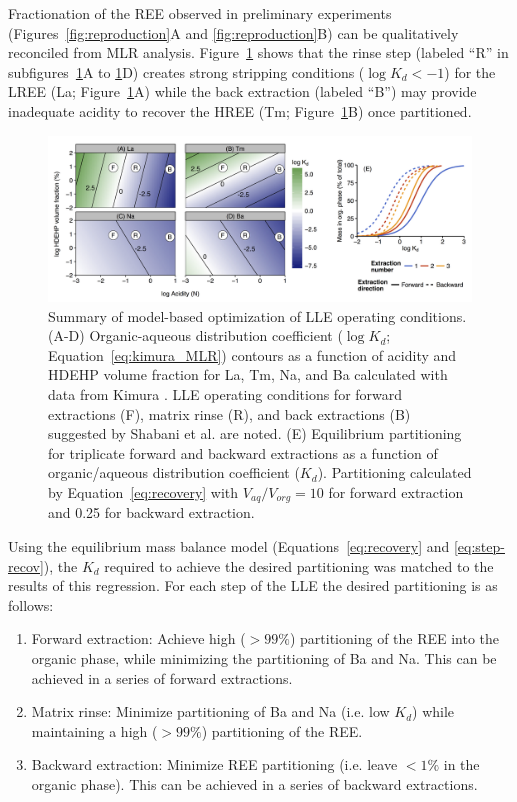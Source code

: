 Fractionation of the REE observed in preliminary experiments (Figures~\ref{fig:reproduction}A and \ref{fig:reproduction}B) can be qualitatively reconciled from MLR analysis.
Figure~\ref{fig:MLR-results} shows that the rinse step (labeled ``R'' in subfigures~\ref{fig:MLR-results}A to \ref{fig:MLR-results}D) creates strong stripping conditions ($\log K_d<-1$) for the LREE (La; Figure~\ref{fig:MLR-results}A) while the back extraction (labeled ``B'') may provide inadequate acidity to recover the HREE (Tm; Figure~\ref{fig:MLR-results}B) once partitioned.

\begin{figure}
\begin{center}
\includegraphics[width=\textwidth]{Ch4_figures/Kd-mod-plot.png}
\caption{Summary of model-based optimization of LLE operating conditions.
(A-D) Organic-aqueous distribution coefficient ($\log K_d$; Equation~\ref{eq:kimura_MLR}) contours as a function of acidity and HDEHP volume fraction for La, Tm, Na, and Ba calculated with data from Kimura \citep{Kimura_BCSJ_1960, Kimura_BCSJ_1961}.
LLE operating conditions for forward extractions (F), matrix rinse (R), and back extractions (B) suggested by Shabani et al. \citep{Shabani_AC_1990} are noted.
(E) Equilibrium partitioning for triplicate forward and backward extractions as a function of organic/aqueous distribution coefficient ($K_d$).
Partitioning calculated by Equation~\ref{eq:recovery} with $V_{aq}/V_{org} = 10$ for forward extraction and 0.25 for backward extraction.}
\label{fig:MLR-results}
\end{center}
\end{figure}


Using the equilibrium mass balance model (Equations~\ref{eq:recovery} and \ref{eq:step-recov}), the $K_d$ required to achieve the desired partitioning was matched to the results of this regression.
For each step of the LLE the desired partitioning is as follows:
\begin{enumerate}
	\item Forward extraction: Achieve high ($>99\%$) partitioning of the REE into the organic phase, while minimizing the partitioning of Ba and Na.
This can be achieved in a series of forward extractions.
	\item	Matrix rinse: Minimize partitioning of Ba and Na (i.e. low $K_d$) while maintaining a high ($>99\%$) partitioning of the REE. 
	\item Backward extraction: Minimize REE partitioning (i.e. leave $<1\%$ in the organic phase).
	This can be achieved in a series of backward extractions.
\end{enumerate}

